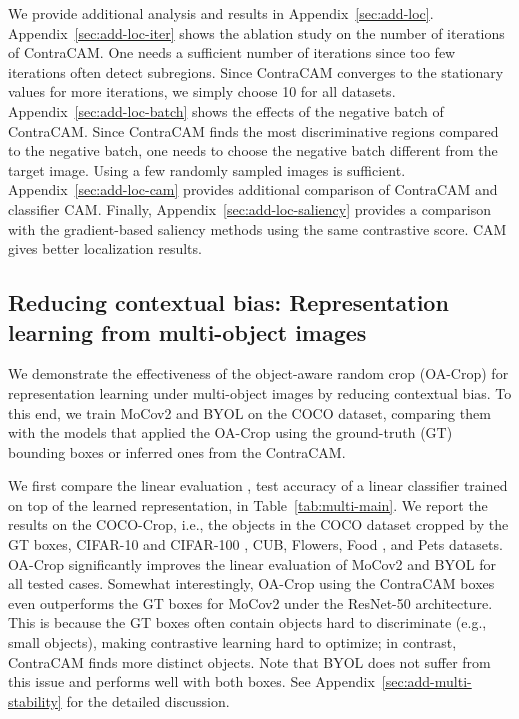 \documentclass{article}
\begin{document}
We provide additional analysis and results in Appendix~\ref{sec:add-loc}. Appendix~\ref{sec:add-loc-iter} shows the ablation study on the number of iterations of ContraCAM. One needs a sufficient number of iterations since too few iterations often detect subregions. Since ContraCAM converges to the stationary values for more iterations, we simply choose 10 for all datasets. Appendix~\ref{sec:add-loc-batch} shows the effects of the negative batch of ContraCAM. Since ContraCAM finds the most discriminative regions compared to the negative batch, one needs to choose the negative batch different from the target image. Using a few randomly sampled images is sufficient. Appendix~\ref{sec:add-loc-cam} provides additional comparison of ContraCAM and classifier CAM. Finally, Appendix~\ref{sec:add-loc-saliency} provides a comparison with the gradient-based saliency methods \citep{sundararajan2017axiomatic,smilkov2017smoothgrad} using the same contrastive score. CAM gives better localization results.


\subsection{Reducing contextual bias: Representation learning from multi-object images}
\label{sec:exp-multi}




We demonstrate the effectiveness of the object-aware random crop (OA-Crop) for representation learning under multi-object images by reducing contextual bias. To this end, we train MoCov2 and BYOL on the COCO dataset, comparing them with the models that applied the OA-Crop using the ground-truth (GT) bounding boxes or inferred ones from the ContraCAM.

We first compare the linear evaluation \citep{kolesnikov2019revisiting}, test accuracy of a linear classifier trained on top of the learned representation, in Table~\ref{tab:multi-main}. We report the results on the COCO-Crop, i.e., the objects in the COCO dataset cropped by the GT boxes, CIFAR-10 and CIFAR-100 \citep{krizhevsky2009learning}, CUB, Flowers, Food \citep{bossard2014food}, and Pets \citep{parkhi2012cats} datasets. OA-Crop significantly improves the linear evaluation of MoCov2 and BYOL for all tested cases. Somewhat interestingly, OA-Crop using the ContraCAM boxes even outperforms the GT boxes for MoCov2 under the ResNet-50 architecture. This is because the GT boxes often contain objects hard to discriminate (e.g., small objects), making contrastive learning hard to optimize; in contrast, ContraCAM finds more distinct objects. Note that BYOL does not suffer from this issue and performs well with both boxes. See Appendix~\ref{sec:add-multi-stability} for the detailed discussion.
\end{document}
